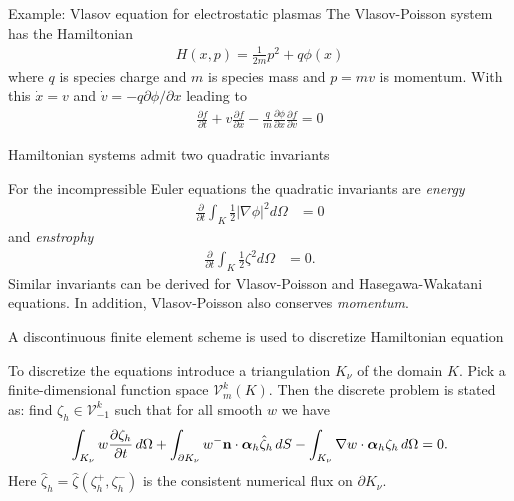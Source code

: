 \documentclass[pdf]{beamer}
\newcommand{\pfrac}[2]{\frac{\partial #1}{\partial #2}}
\newcommand{\pfraca}[1]{\frac{\partial}{\partial #1}}
\newcommand{\mvec}[1]{\mathbf{#1}}
\newcommand{\gvec}[1]{\boldsymbol{#1}}
\theoremstyle{definition}
\begin{document}
\begin{frame}{Example: Vlasov equation for electrostatic plasmas}%
  The Vlasov-Poisson system has the Hamiltonian
  \begin{align*}
    H(x,p) = \frac{1}{2m}p^2 + q\phi(x)
  \end{align*}
  where $q$ is species charge and $m$ is species mass and $p=mv$ is
  momentum. With this $\dot{x} = v$ and $\dot{v} =
  -q\partial\phi/\partial x$ leading to
  \begin{align*}
    \pfrac{f}{t} + v\pfrac{f}{x} -
    \frac{q}{m}\pfrac{\phi}{x}\pfrac{f}{v} = 0
  \end{align*}
\end{frame}

\begin{frame}{Hamiltonian systems admit two quadratic invariants}%

  For the incompressible Euler equations the quadratic invariants are
  \emph{energy}
  \begin{align*}
    \pfraca{t}\int_K \frac{1}{2} |\nabla\phi|^2  d\Omega &= 0
  \end{align*}
  and \emph{enstrophy}
  \begin{align*}
    \pfraca{t}\int_K \frac{1}{2}\zeta^2 d\Omega &= 0.
  \end{align*}
  Similar invariants can be derived for Vlasov-Poisson and
  Hasegawa-Wakatani equations. In addition, Vlasov-Poisson also
  conserves \emph{momentum}.

\end{frame}

\begin{frame}{A discontinuous finite element scheme is used to
    discretize Hamiltonian equation}

  To discretize the equations introduce a triangulation $K_\nu$ of the
  domain $K$. Pick a finite-dimensional function space
  $\mathcal{V}^k_m(K)$. Then the discrete problem is stated as: find
  $\zeta_h\in \mathcal{V}^k_{-1}$ such that for all smooth $w$ we have
  \begin{align*}
    \int_{K_\nu} w \pfrac{\zeta_h}{t}\thinspace d\Omega 
    +
    \int_{\partial K_\nu}w^- \mvec{n}\cdot\gvec{\alpha}_h\hat{\zeta}_h\thinspace dS
    -
    \int_{K_\nu} \nabla w\cdot\gvec{\alpha}_h \zeta_h\thinspace d\Omega = 0.
  \end{align*}
  Here $\hat{\zeta}_h = \hat{\zeta}(\zeta^+_h,\zeta^-_h)$ is the
  consistent numerical flux on $\partial K_\nu$.
\end{frame}
\end{document}
